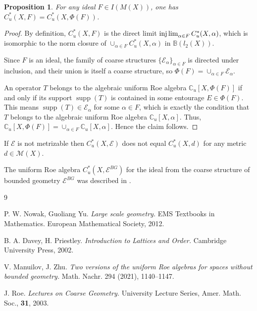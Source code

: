 \documentclass[reqno,12pt]{amsart}
\newcommand{\supp}{\operatorname{supp}}
\theoremstyle{plain}%
\newtheorem{prop}[thm]{Proposition}
\theoremstyle{definition}
\theoremstyle{remark}
\numberwithin{equation}{section}
\begin{document}
\begin{prop}
For any ideal $F\in I(M(X))$, one has
$C^*_u(X,F)=C^*_u(X,\Phi(F))$.

\end{prop}
\begin{proof}
By definition, $C^*_u(X,F)$ is the direct limit $\injlim_{\alpha\in F}C^*_u(X,\alpha)$, which is isomorphic to the norm closure of $\cup_{\alpha\in F}C^*_u(X,\alpha)$ in $\mathbb{B}(l_2(X))$.

Since $F$ is an ideal, the family of coarse structures $\{\mathcal{E}_\alpha\}_{\alpha\in F}$ is directed under inclusion, and their union is itself a coarse structure, so $\Phi(F)=\cup_{\alpha\in F}\mathcal{E}_\alpha$.

An operator $T$ belongs to the algebraic uniform Roe algebra $\mathbb{C}_u[X,\Phi(F)]$ if and only if its support $\supp(T)$ is contained in some entourage $E\in\Phi(F)$. This means $\supp(T)\in\mathcal{E}_\alpha$ for some $\alpha\in F$, which is exactly the condition that $T$ belongs to the algebraic uniform Roe algebra $\mathbb{C}_u[X,\alpha]$. Thus, $\mathbb{C}_u[X,\Phi(F)]=\cup_{\alpha\in F}\mathbb{C}_u[X,\alpha]$. Hence the claim follows.
\end{proof}


If $\mathcal E$ is not metrizable then $C^*_u(X,\mathcal E)$ does not equal $C^*_u(X,d)$ for any metric $d\in\mathcal M(X)$.

The uniform Roe algebra $C^*_u(X,\mathcal E^{BG})$ for the ideal from the coarse structure of bounded geometry $\mathcal E^{BG}$ was described in \cite{Man-Zhu}. 

\begin{thebibliography}{9}
 



P. W. Nowak, Guoliang Yu. \textit{Large scale geometry.} EMS Textbooks in Mathematics. European Mathematical Society, 2012.

B. A. Davey, H. Priestley. 
\textit{Introduction to Lattices and Order.} Cambridge University Press, 2002.

V. Manuilov, J. Zhu. \textit{Two versions of the uniform Roe algebras for spaces without bounded geometry.} Math. Nachr. 294 (2021), 1140--1147. 

J. Roe. {\it Lectures on Coarse Geometry.} University Lecture Series, Amer. Math. Soc., {\bf 31}, 2003.




\end{thebibliography}
\end{document}
